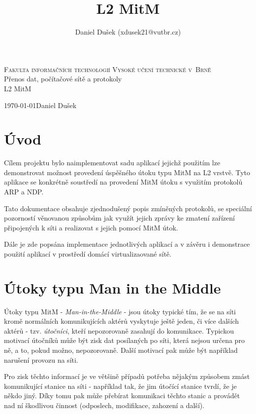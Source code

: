 \documentclass[a4paper, 11pt]{article}
\title{L2 MitM}
\author{Daniel Dušek (xdusek21@vutbr.cz)}
\begin{document}
\thispagestyle{empty}
\begin{center}
\Huge
\textsc{Fakulta informačních technologií
Vysoké učení technické v~Brně}\\
\LARGE
{}
Přenos dat, počítačové sítě a protokoly\\
L2 MitM

\end{center}
{\Large \today \hfill Daniel Dušek}

\newpage
\tableofcontents

\newpage
\setcounter{page}{1} 

\section{Úvod}
	\indent\par{Cílem projektu bylo naimplementovat sadu aplikací jejichž použitím lze demonstrovat možnost provedení úspěšného útoku typu MitM na L2 vrstvě. Tyto aplikace se konkrétně soustředí na provedení MitM útoku s využitím protokolů ARP a NDP.}
	\par{Tato dokumentace obsahuje zjednodušený popis zmíněných protokolů, se speciální pozorností věnovanou způsobům jak využít jejich zprávy ke zmatení zařízení připojených k síti a realizovat s jejich pomocí MitM útok.}
	\par{Dále je zde popsána implementace jednotlivých aplikací a v závěru i demonstrace použití aplikací v prostředí domácí virtualizaované sítě.}

\newpage
\section{Útoky typu Man in the Middle}
	\indent\par{Útoky typu MitM \-- \textit{Man-in-the-Middle} \-- jsou útoky typické tím, že se na síti kromě normálních komunikujících aktérů vyskytuje ještě jeden, či více dalších aktérů \-- tzv. \textit{útočníci}, kteří nepozorovaně zasahují do komunikace. Typickou motivací útočníků může být zisk dat posílaných po síti, která nejsou určena pro ně, a to, pokud možno, nepozorovaně. Další motivací pak může být například narušení provozu na síti.}

	\par{Pro zisk těchto informací je ve většině případů potřeba nějakým způsobem zmást komunikující stanice na síti \-- například tak, že jim útočící stanice tvrdí, že je někdo jiný. Díky tomu pak může přebírat komunikaci těchto stanic a provádět nad ní škodlivou činnost (odposlech, modifikace, zahození a další).}
\end{document}
